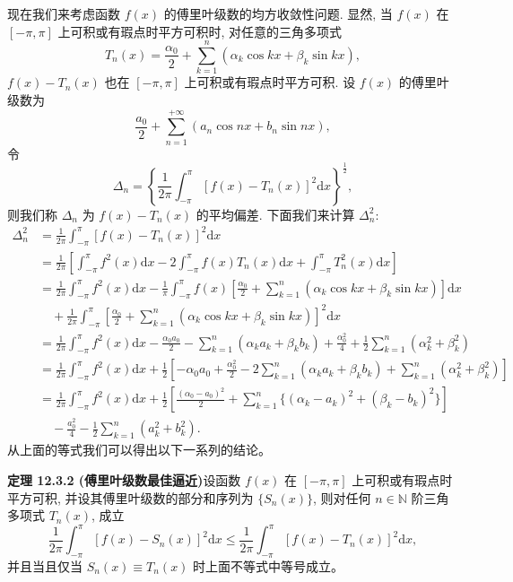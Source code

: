 \documentclass[UTF8, 12pt, fontset=fandol, oneside]{ctexart}
\begin{document}
现在我们来考虑函数 $f(x)$ 的傅里叶级数的均方收敛性问题. 显然, 当 $f(x)$ 在 $[-\pi,\pi]$ 上可积或有瑕点时平方可积时, 对任意的三角多项式
\[
  T_n(x)=\frac{\alpha_0}{2}+\sum_{k=1}^n(\alpha_k\cos kx+\beta_k\sin kx),
\]
$f(x)-T_n(x)$ 也在 $[-\pi,\pi]$ 上可积或有瑕点时平方可积. 设 $f(x)$ 的傅里叶级数为
\[
  \frac{a_0}{2}+\sum_{n=1}^{+\infty}(a_n\cos nx+b_n\sin nx),
\]
令
\[
  \Delta_n=\left\{\frac1{2\pi}\int_{-\pi}^{\pi}[f(x)-T_n(x)]^2\mathrm dx\right\}^{\frac12},
\]
则我们称 $\Delta_n$ 为 $f(x)-T_n(x)$ 的平均偏差. 下面我们来计算 $\Delta_n^2$:
\[
\begin{aligned}
  \Delta_n^2
  &=\frac1{2\pi}\int_{-\pi}^{\pi}[f(x)-T_n(x)]^2\mathrm dx\\
  &=\frac1{2\pi}\left[
    \int_{-\pi}^{\pi}f^2(x)\mathrm dx
    -2\int_{-\pi}^{\pi}f(x)T_n(x)\mathrm dx
    +\int_{-\pi}^{\pi}T_n^2(x)\mathrm dx
  \right]\\
  &=\frac1{2\pi}\int_{-\pi}^{\pi}f^2(x)\mathrm dx
    -\frac1\pi\int_{-\pi}^{\pi}f(x)
    \left[\frac{\alpha_0}{2}+\sum_{k=1}^n(\alpha_k\cos kx+\beta_k\sin kx)\right]\mathrm dx\\
  &\quad+\frac1{2\pi}\int_{-\pi}^{\pi}
    \left[\frac{\alpha_0}{2}+\sum_{k=1}^n(\alpha_k\cos kx+\beta_k\sin kx)\right]^2\mathrm dx\\
  &=\frac1{2\pi}\int_{-\pi}^{\pi}f^2(x)\mathrm dx
    -\frac{\alpha_0a_0}{2}
    -\sum_{k=1}^n(\alpha_ka_k+\beta_kb_k)
    +\frac{\alpha_0^2}{4}
    +\frac12\sum_{k=1}^n(\alpha_k^2+\beta_k^2)\\
  &=\frac1{2\pi}\int_{-\pi}^{\pi}f^2(x)\mathrm dx
    +\frac12\left[
      -\alpha_0a_0+\frac{\alpha_0^2}{2}
      -2\sum_{k=1}^n(\alpha_ka_k+\beta_kb_k)
      +\sum_{k=1}^n(\alpha_k^2+\beta_k^2)
    \right]\\
  &=\frac1{2\pi}\int_{-\pi}^{\pi}f^2(x)\mathrm dx
    +\frac12\left[
      \frac{(\alpha_0-a_0)^2}{2}
      +\sum_{k=1}^n\{(\alpha_k-a_k)^2+(\beta_k-b_k)^2\}
    \right]\\
  &\quad-\frac{a_0^2}{4}
    -\frac12\sum_{k=1}^n(a_k^2+b_k^2).
\end{aligned}
\]
从上面的等式我们可以得出以下一系列的结论。

\noindent\textbf{定理 12.3.2 (傅里叶级数最佳逼近)}\quad 设函数 $f(x)$ 在 $[-\pi,\pi]$ 上可积或有瑕点时平方可积, 并设其傅里叶级数的部分和序列为 $\{S_n(x)\}$, 则对任何 $n\in\mathbb N$ 阶三角多项式 $T_n(x)$, 成立
\[
  \frac1{2\pi}\int_{-\pi}^{\pi}[f(x)-S_n(x)]^2\mathrm dx
  \leqslant
  \frac1{2\pi}\int_{-\pi}^{\pi}[f(x)-T_n(x)]^2\mathrm dx,
\]
并且当且仅当 $S_n(x)\equiv T_n(x)$ 时上面不等式中等号成立。
\end{document}
